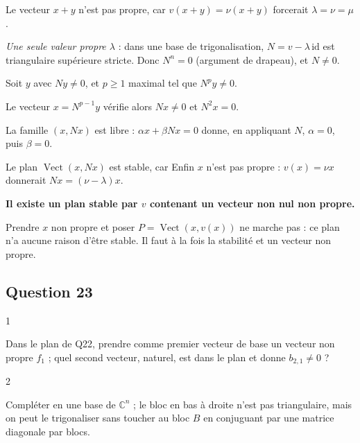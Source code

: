 \documentclass[11pt,a4paper]{article}
\newcommand{\equationajustee}[1]{%
  \sbox{\boiteequation}{$\displaystyle #1$}%
  \ifdim\wd\boiteequation>\linewidth
    \[\resizebox{\linewidth}{!}{\usebox{\boiteequation}}\]%
  \else
    \[#1\]%
  \fi}
\begin{document}
Le vecteur \(x+y\) n'est pas propre, car \(v(x+y)=\nu(x+y)\) forcerait \(\lambda=\nu=\mu\).

\emph{Une seule valeur propre \(\lambda\)} : dans une base de trigonalisation, \(N=v-\lambda\,\mathrm{id}\) est triangulaire supérieure stricte. Donc \(N^n=0\) (argument de drapeau), et \(N\neq0\).

Soit \(y\) avec \(Ny\neq0\), et \(p\ge1\) maximal tel que \(N^py\neq0\).

Le vecteur \(x=N^{p-1}y\) vérifie alors \(Nx\neq0\) et \(N^2x=0\).

La famille \((x,Nx)\) est libre : \(\alpha x+\beta Nx=0\) donne, en appliquant \(N\), \(\alpha=0\), puis \(\beta=0\).

Le plan \(\operatorname{Vect}(x,Nx)\) est stable, car
\equationajustee{\begin{aligned}v(x)&=\lambda x+Nx,\\ v(Nx)&=\lambda Nx.\end{aligned}}
Enfin \(x\) n'est pas propre : \(v(x)=\nu x\) donnerait \(Nx=(\nu-\lambda)x\).

\textbf{Il existe un plan stable par \(v\) contenant un vecteur non nul non propre.}

\begin{piege}

Prendre \(x\) non propre et poser \(P=\operatorname{Vect}(x,v(x))\) ne marche pas : ce plan n'a aucune raison d'être stable. Il faut à la fois la stabilité et un vecteur non propre.

\end{piege}

\hypertarget{question-23}{%
\subsection{Question 23}\label{question-23}}

\begin{indication}{1}

Dans le plan de Q22, prendre comme premier vecteur de base un vecteur non propre \(f_1\) ; quel second vecteur, naturel, est dans le plan et donne \(b_{2,1}\neq0\) ?

\end{indication}

\begin{indication}{2}

Compléter en une base de \(\mathbb C^n\) ; le bloc en bas à droite n'est pas triangulaire, mais on peut le trigonaliser sans toucher au bloc \(B\) en conjuguant par une matrice diagonale par blocs.

\end{indication}
\end{document}
